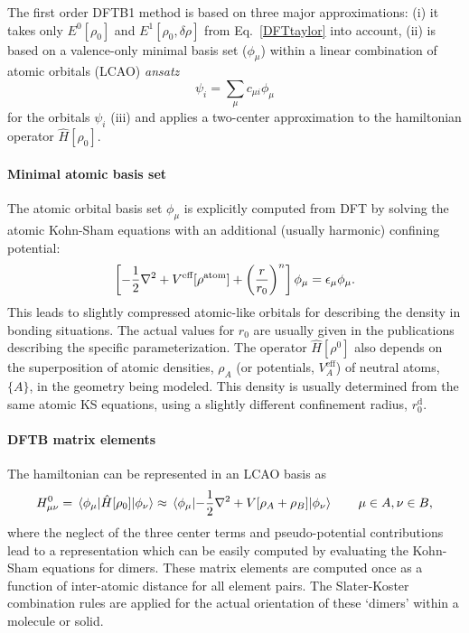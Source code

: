 \documentclass{revtex4-1}
\begin{document}
The first order DFTB1 method is based on three major approximations: (i) it
takes only $E^0[\rho_0]$ and $ E^1[\rho_0,\delta \rho]$ from
Eq.~\eqref{DFTtaylor} into account, (ii) is based on a valence-only minimal
basis set ($\phi_\mu$) within a linear combination of atomic orbitals (LCAO)
{\it ansatz}
\begin{equation}
  \psi_i=\sum_\mu c_{\mu i}\phi_\mu
\end{equation}
for the orbitals $\psi_i$ (iii) and applies a two-center approximation to the
hamiltonian operator $\hat{H}[\rho_0]$.

\paragraph{Minimal atomic basis set}
The atomic orbital basis set $\phi_\mu$ is explicitly computed from DFT by
solving the atomic Kohn-Sham equations with an additional (usually harmonic)
confining potential:
\begin{equation}
  \left[ -\frac{1}{2} \nabla^2 + V^{\mbox{\scriptsize
        eff}}[\rho^{\mbox{\scriptsize atom}}] + \left( \frac{r}{r_0}\right)^n
    \right] \phi_{\mu} = \epsilon_{\mu} \phi_{\mu} \text.\label{eqn:DFTBatom}
\end{equation}
This leads to slightly compressed atomic-like orbitals for describing the
density in bonding situations. The actual values for $r_0$ are usually given in
the publications describing the specific parameterization.  The operator
$\hat{H}[\rho^0]$ also depends on the superposition of atomic densities,
$\rho_A$ (or potentials, $V_A^\text{eff}$) of neutral atoms, $\{A\}$, in the
geometry being modeled.  This density is usually determined from the same atomic
KS equations, using a slightly different confinement radius, $r_0^\text{d}$.


\paragraph{DFTB matrix elements}

The hamiltonian can be represented in an LCAO basis as
\begin{eqnarray}
  H_{\mu\nu}^0 = \mel{\phi_{\mu}}{\hat{H}[\rho_0]}{\phi_{\nu}} \approx
  \mel{\phi_{\mu}}{- \frac{1}{2} \nabla^2 +V[\rho_A +
      \rho_B]}{\phi_{\nu}}\qquad{\mu \in A, \nu \in B},
  \label{eqn:matelements}
\end{eqnarray}
where the neglect of the three center terms and pseudo-potential
contributions\cite{ElstnerSeifertBBA2014} lead to a representation which can be
easily computed by evaluating the Kohn-Sham equations for dimers. These matrix
elements are computed once as a function of inter-atomic distance for all element
pairs. The Slater-Koster\cite{PhysRev.94.1498} combination rules are applied for
the actual orientation of these `dimers' within a molecule or solid.
\end{document}
